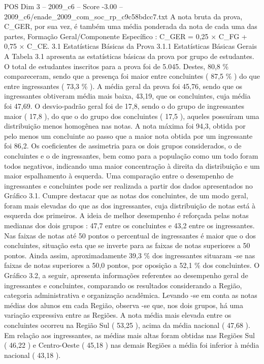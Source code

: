 \begin{textsample}{POS Dim 3 – 2009\_c6 – Score -3.00 – 2009\_c6/enade\_2009\_com\_soc\_rp\_c9c58bdcc7.txt}
A nota bruta da prova, C\_GER, por sua vez, é também uma média ponderada da nota de cada uma das partes, Formação Geral/Componente Específico : C\_GER = 0,25 × C\_FG + 0,75 × C\_CE. 3.1 Estatísticas Básicas da Prova 3.1.1 Estatísticas Básicas Gerais A Tabela 3.1 apresenta as estatísticas básicas da prova por grupo de estudantes.
O total de estudantes inscritos para a prova foi de 5.045.
Destes, 80,8 \% compareceram, sendo que a presença foi maior entre concluintes ( 87,5 \% ) do que entre ingressantes ( 73,3 \% ).
A média geral da prova foi 45,76, sendo que os ingressantes obtiveram média mais baixa, 43,19, que os concluintes, cuja média foi 47,69.
O desvio-padrão geral foi de 17,8, sendo o do grupo de ingressantes maior ( 17,8 ), do que o do grupo dos concluintes ( 17,5 ), aqueles possuíram uma distribuição menos homogênea nas notas.
A nota máxima foi 94,3, obtida por pelo menos um concluinte ao passo que a maior nota obtida por um ingressante foi 86,2.
Os coeficientes de assimetria para os dois grupos considerados, o de concluintes e o de ingressantes, bem como para a população como um todo foram todos negativos, indicando uma maior concentração à direita da distribuição e um maior espalhamento à esquerda.
Uma comparação entre o desempenho de ingressantes e concluintes pode ser realizada a partir dos dados apresentados no Gráfico 3.1.
Cumpre destacar que as notas dos concluintes, de um modo geral, foram mais elevadas do que as dos ingressantes, cuja distribuição de notas está à esquerda dos primeiros.
A ideia de melhor desempenho é reforçada pelas notas medianas dos dois grupos : 47,7 entre os concluintes e 43,2 entre os ingressantes.
Nas faixas de notas até 50 pontos o percentual de ingressantes é maior que o dos concluintes, situação esta que se inverte para as faixas de notas superiores a 50 pontos.
Ainda assim, aproximadamente 39,3 \% dos ingressantes situaram -se nas faixas de notas superiores a 50,0 pontos, por oposição a 52,1 \% dos concluintes.
O Gráfico 3.2, a seguir, apresenta informações referentes ao desempenho geral de ingressantes e concluintes, comparando os resultados considerando a Região, categoria administrativa e organização acadêmica.
Levando -se em conta as notas médias dos alunos em cada Região, observa -se que, nos dois grupos, há uma variação expressiva entre as Regiões.
A nota média mais elevada entre os concluintes ocorreu na Região Sul ( 53,25 ), acima da média nacional ( 47,68 ).
Em relação aos ingressantes, as médias mais altas foram obtidas nas Regiões Sul ( 46,22 ) e Centro-Oeste ( 45,18 ) nas demais Regiões a média foi inferior à média nacional ( 43,18 ).

\end{textsample}
